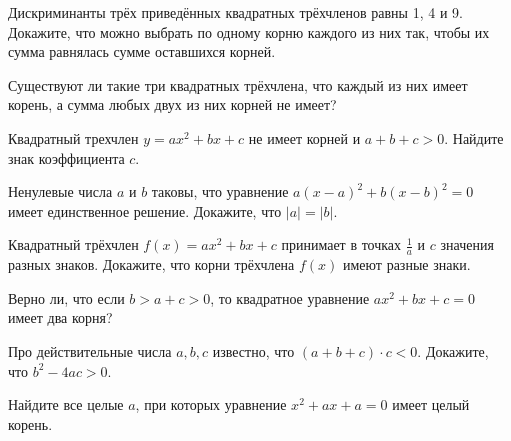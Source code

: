 \documentclass{article}
\begin{document}
\begin{enumerate_boxed}
        \item Дискриминанты трёх приведённых квадратных трёхчленов равны 1, 4 и 9.
        Докажите, что можно выбрать по одному корню каждого из них так, чтобы их сумма равнялась сумме оставшихся корней.

        \item Существуют ли такие три квадратных трёхчлена, что каждый из них имеет корень, а сумма любых двух из них корней не имеет?

        \item Квадратный трехчлен  $y = ax^2 + bx + c$  не имеет корней и  $a + b + c > 0$.
        Найдите знак коэффициента $c$.

        \item Ненулевые числа $a$ и $b$ таковы, что уравнение $a(x - a)^2 + b(x - b)^2 = 0$ имеет единственное решение.
        Докажите, что $|a| = |b|$.

        \item Квадратный трёхчлен $f(x) = ax^2 + bx + c$ принимает в точках $\frac{1}{a}$ и $c$ значения разных знаков.
        Докажите, что корни трёхчлена $f(x)$ имеют разные знаки.

        \item Верно ли, что если  $b > a + c > 0$,  то квадратное уравнение $ax^2 + bx + c = 0$ имеет два корня?

        \item Про действительные числа $a, b, c$ известно, что $(a + b + c)\cdot c < 0$.
        Докажите, что $b^2 - 4ac>0$.

        \item Найдите все целые $a$, при которых уравнение $x^2 + ax + a = 0$ имеет целый корень.

    \end{enumerate_boxed}
\end{document}
